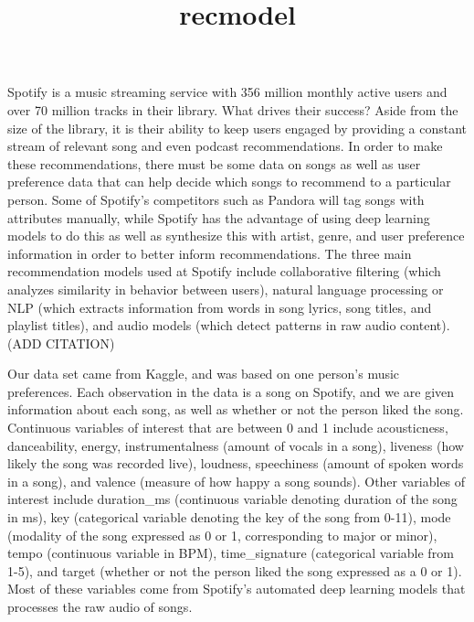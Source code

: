 \documentclass[
]{article}
\title{recmodel}
\author{}
\date{\vspace{-2.5em}}
\begin{document}
\maketitle

Spotify is a music streaming service with 356 million monthly active
users and over 70 million tracks in their library. What drives their
success? Aside from the size of the library, it is their ability to keep
users engaged by providing a constant stream of relevant song and even
podcast recommendations. In order to make these recommendations, there
must be some data on songs as well as user preference data that can help
decide which songs to recommend to a particular person. Some of
Spotify's competitors such as Pandora will tag songs with attributes
manually, while Spotify has the advantage of using deep learning models
to do this as well as synthesize this with artist, genre, and user
preference information in order to better inform recommendations. The
three main recommendation models used at Spotify include collaborative
filtering (which analyzes similarity in behavior between users), natural
language processing or NLP (which extracts information from words in
song lyrics, song titles, and playlist titles), and audio models (which
detect patterns in raw audio content). (ADD CITATION)

Our data set came from Kaggle, and was based on one person's music
preferences. Each observation in the data is a song on Spotify, and we
are given information about each song, as well as whether or not the
person liked the song. Continuous variables of interest that are between
0 and 1 include acousticness, danceability, energy, instrumentalness
(amount of vocals in a song), liveness (how likely the song was recorded
live), loudness, speechiness (amount of spoken words in a song), and
valence (measure of how happy a song sounds). Other variables of
interest include duration\_ms (continuous variable denoting duration of
the song in ms), key (categorical variable denoting the key of the song
from 0-11), mode (modality of the song expressed as 0 or 1,
corresponding to major or minor), tempo (continuous variable in BPM),
time\_signature (categorical variable from 1-5), and target (whether or
not the person liked the song expressed as a 0 or 1). Most of these
variables come from Spotify's automated deep learning models that
processes the raw audio of songs.
\end{document}
